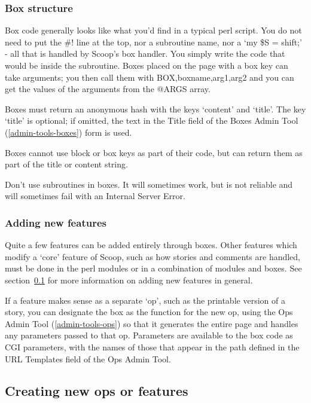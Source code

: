\subsubsection{Box structure}

Box code generally looks like what you'd find in a typical perl script. You do not need to put the \#! line at the top, nor a subroutine name, nor a `my \$S = shift;' - all that is handled by Scoop's box handler. You simply write the code that would be inside the subroutine.  Boxes placed on the page with a box key can take arguments; you then call them with \latexhtml{$\vert$}{|}BOX,boxname,arg1,arg2\latexhtml{$\vert$}{|} and you can get the values of the arguments from the @ARGS array.

Boxes must return an anonymous hash with the keys `content' and `title'. The key `title' is optional; if omitted, the text in the Title field of the Boxes Admin Tool (\ref{admin-tools-boxes}) form is used.

Boxes cannot use block or box keys as part of their code, but can return them as part of the title or content string.

Don't use subroutines in boxes. It will sometimes work, but is not reliable and will sometimes fail with an Internal Server Error.

\subsubsection{Adding new features}

Quite a few features can be added entirely through boxes. Other features which modify a `core' feature of Scoop, such as how stories and comments are handled, must be done in the perl modules or in a combination of modules and boxes.  See section~\ref{hacking-new-feature} for more information on adding new features in general.

If a feature makes sense as a separate `op', such as the printable version of a story, you can designate the box as the function for the new op, using the Ops Admin Tool (\ref{admin-tools-ops}) so that it generates the entire page and handles any parameters passed to that op. Parameters are available to the box code as CGI parameters, with the names of those that appear in the path defined in the URL Templates field of the Ops Admin Tool.

\subsection{Creating new ops or features}
\label{hacking-new-feature}

